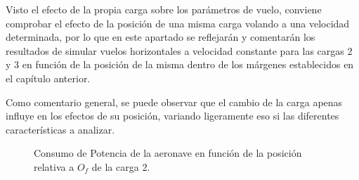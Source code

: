Visto el efecto de la propia carga sobre los parámetros de vuelo, conviene comprobar el efecto de la posición de una misma carga volando a una velocidad determinada, por lo que en este apartado se reflejarán y comentarán los resultados de simular vuelos horizontales a velocidad constante para las cargas 2 y 3 en función de la posición de la misma dentro de los márgenes establecidos en el capítulo anterior.

Como comentario general, se puede observar que el cambio de la carga apenas influye en los efectos de su posición, variando ligeramente eso si las diferentes características a analizar.

\begin{figure}
	\centering
	\caption{Consumo de Potencia de la aeronave en función de la posición relativa a $O_f$ de la carga 2.}
	\label{PMVH2lxy}
\end{figure}
